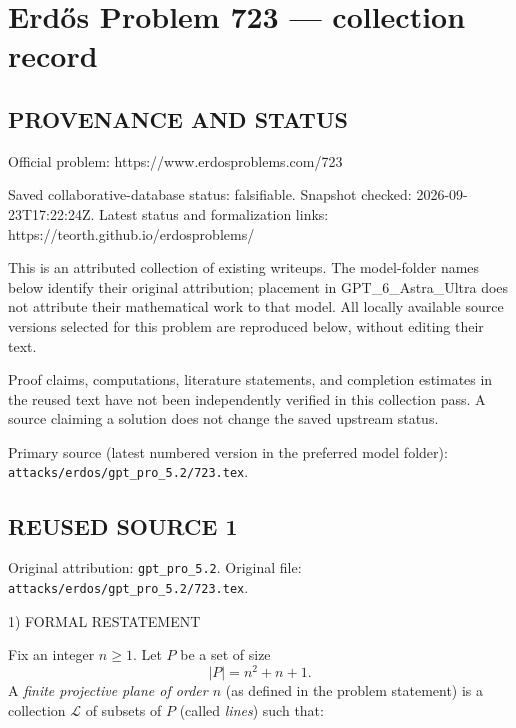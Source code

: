 \section*{Erd\H{o}s Problem 723 --- collection record}

\subsection*{PROVENANCE AND STATUS}
Official problem: https://www.erdosproblems.com/723

Saved collaborative-database status: falsifiable.
Snapshot checked: 2026-09-23T17:22:24Z.
Latest status and formalization links: https://teorth.github.io/erdosproblems/

This is an attributed collection of existing writeups. The model-folder names below identify their original attribution; placement in GPT\_6\_Astra\_Ultra does not attribute their mathematical work to that model. All locally available source versions selected for this problem are reproduced below, without editing their text.

Proof claims, computations, literature statements, and completion estimates in the reused text have not been independently verified in this collection pass. A source claiming a solution does not change the saved upstream status.

Primary source (latest numbered version in the preferred model folder): \texttt{attacks/erdos/gpt\_pro\_5.2/723.tex}.

\subsection*{REUSED SOURCE 1}
Original attribution: \texttt{gpt\_pro\_5.2}.
Original file: \texttt{attacks/erdos/gpt\_pro\_5.2/723.tex}.


1) FORMAL RESTATEMENT

Fix an integer $n\ge 1$. Let $P$ be a set of size
\[
|P| = n^2+n+1.
\]
A \emph{finite projective plane of order $n$} (as defined in the problem statement) is a collection $\mathcal L$ of subsets of $P$ (called \emph{lines}) such that:

